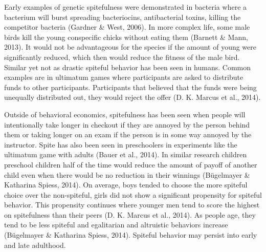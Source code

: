 \documentclass[
  english,
  donotrepeattitle,doc, 12pt, a4paper,floatsintext]{apa7}
\begin{document}
Early examples of genetic spitefulness were demonstrated in bacteria where a bacterium will burst spreading bacteriocins, antibacterial toxins, killing the competitor bacteria (Gardner \& West, 2006). In more complex life, some male birds kill the young conspecific chicks without eating them (Barnett \& Mann, 2013). It would not be advantageous for the species if the amount of young were significantly reduced, which then would reduce the fitness of the male bird. Similar yet not as drastic spiteful behavior has been seen in humans. Common examples are in ultimatum games where participants are asked to distribute funds to other participants. Participants that believed that the funds were being unequally distributed out, they would reject the offer (D. K. Marcus et al., 2014).

Outside of behavioral economics, spitefulness has been seen when people will intentionally take longer in checkout if they are annoyed by the person behind them or taking longer on an exam if the person is in some way annoyed by the instructor. Spite has also been seen in preschoolers in experiments like the ultimatum game with adults (Bauer et al., 2014). In similar research children preschool children half of the time would reduce the amount of payoff of another child even when there would be no reduction in their winnings (Bügelmayer \& Katharina Spiess, 2014). On average, boys tended to choose the more spiteful choice over the non-spiteful, girls did not show a significant propensity for spiteful behavior. This propensity continues where younger men tend to score the highest on spitefulness than their peers (D. K. Marcus et al., 2014). As people age, they tend to be less spiteful and egalitarian and altruistic behaviors increase (Bügelmayer \& Katharina Spiess, 2014). Spiteful behavior may persist into early and late adulthood.\\
\end{document}
